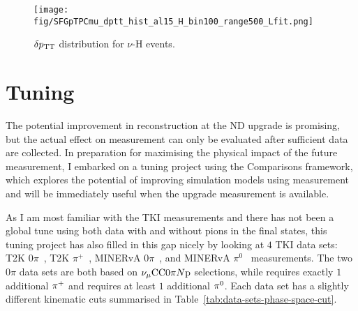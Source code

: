    \begin{figure}[!htb] 
        \centering 		
        \texttt{[image: fig/SFGpTPCmu\_dptt\_hist\_al15\_H\_bin100\_range500\_Lfit.png]}
        \caption{\label{fig:dptt-hist} $\delta p_\textrm{TT}$ distribution for $\nu$-H events.} 
    \end{figure}


\section{Tuning}

    The potential improvement in reconstruction at the ND upgrade is promising, but the actual effect on measurement can only be evaluated after sufficient data are collected. 
    In preparation for maximising the physical impact of the future measurement, I embarked on a tuning project using the \genie Comparisons framework, which explores the potential of improving simulation models using measurement and will be immediately useful when the upgrade measurement is available. 
    
    As I am most familiar with the TKI measurements and there has not been a global tune using both data with and without pions in the final states, this tuning project has also filled in this gap nicely by looking at $4$ TKI data sets: T2K $0\pi$~\cite{T2K:2018rnz}, T2K $\pi^+$~\cite{T2K:2021naz}, MINERvA $0\pi$~\cite{MINERvA:2018hba, MINERvA:2019ope}, and MINERvA $\pi^0$~\cite{MINERvA:2020anu} measurements. 
    The two $0\pi$ data sets are both based on $\nu_{\mu}\textrm{CC}0\pi N\textrm{p}$ selections, while \ttkpip requires exactly $1$ additional $\pi^+$ and \minpiz requires at least $1$ additional $\pi^0$. Each data set has a slightly different kinematic cuts summarised in Table~\ref{tab:data-sets-phase-space-cut}.

